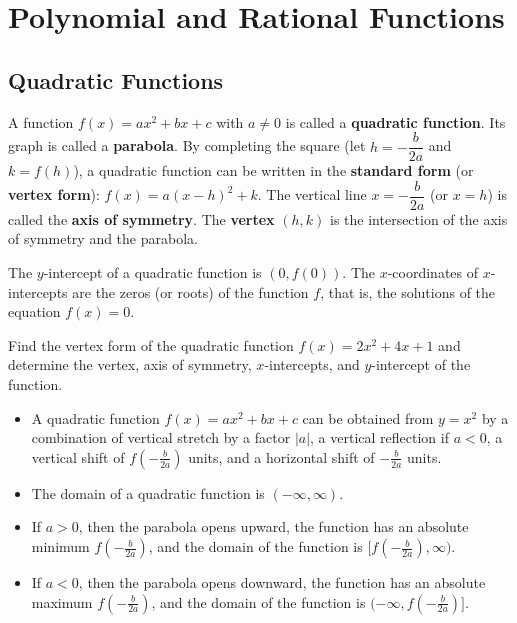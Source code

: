 
\chapter{Polynomial and Rational Functions}

\section{Quadratic Functions}
\begin{definition}
  A function $f(x)=ax^2+bx+c$ with $a\ne 0$ is called a \textbf{quadratic function}. Its graph is called a \textbf{parabola}. By completing the square (let $h=-\dfrac{b}{2a}$ and $k=f(h)$), a quadratic function can be written in the \textbf{standard form} (or \textbf{vertex form}): $f(x)=a(x-h)^2+k$. The vertical line $x=-\dfrac{b}{2a}$ (or $x=h$) is called the \textbf{axis of symmetry}. The \textbf{vertex} $(h,k)$ is the intersection of the axis of symmetry and the parabola.
\end{definition}
\begin{note}
  The $y$-intercept of a quadratic function is $(0, f(0))$. The $x$-coordinates of $x$-intercepts are the zeros (or roots) of the function $f$, that is, the solutions of the equation $f(x)=0$.
\end{note}

\begin{example}
  Find the vertex form of the quadratic function $f(x)=2 x^{2} + 4 x + 1$ and determine the vertex, axis of symmetry, $x$-intercepts, and $y$-intercept of the function.
\end{example}

\begin{note}
  \begin{itemize}
    \item A quadratic function $f(x)=ax^2+bx+c$ can be obtained from $y=x^2$ by a combination of vertical stretch by a factor $|a|$, a vertical reflection if $a<0$, a vertical shift of $f\left(-\frac{b}{2a}\right)$ units, and a horizontal shift of $-\frac{b}{2a}$ units.
    \item The domain of a quadratic function is $(-\infty, \infty)$.
    \item If $a>0$, then the parabola opens upward, the function has an absolute minimum $f\left(-\frac{b}{2a}\right)$, and the domain of the function is $[f\left(-\frac{b}{2a}\right), \infty)$.
    \item If $a<0$, then the parabola opens downward, the function has an absolute maximum $f\left(-\frac{b}{2a}\right)$, and the domain of the function is $(-\infty,f\left(-\frac{b}{2a}\right)]$.
  \end{itemize}
\end{note}
\newpage

